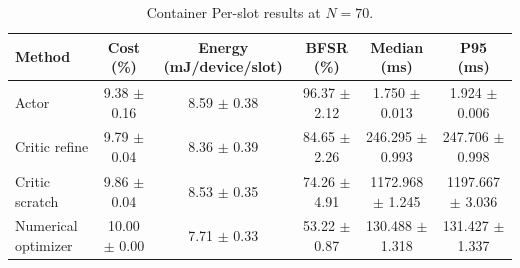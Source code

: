 \begin{table}[t]
\centering
\caption{Container Per-slot results at $N=70$.}
\label{tab:container_per_slot}
\footnotesize
\begin{tabular}{lccccc}
\hline
Method & Cost (\%) & Energy (mJ/device/slot) & BFSR (\%) & Median (ms) & P95 (ms) \\
\hline
Actor & 9.38 $\pm$ 0.16 & 8.59 $\pm$ 0.38 & 96.37 $\pm$ 2.12 & 1.750 $\pm$ 0.013 & 1.924 $\pm$ 0.006 \\
Critic refine & 9.79 $\pm$ 0.04 & 8.36 $\pm$ 0.39 & 84.65 $\pm$ 2.26 & 246.295 $\pm$ 0.993 & 247.706 $\pm$ 0.998 \\
Critic scratch & 9.86 $\pm$ 0.04 & 8.53 $\pm$ 0.35 & 74.26 $\pm$ 4.91 & 1172.968 $\pm$ 1.245 & 1197.667 $\pm$ 3.036 \\
Numerical optimizer & 10.00 $\pm$ 0.00 & 7.71 $\pm$ 0.33 & 53.22 $\pm$ 0.87 & 130.488 $\pm$ 1.318 & 131.427 $\pm$ 1.337 \\
\hline
\end{tabular}
\end{table}
